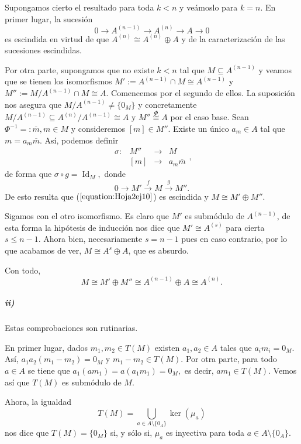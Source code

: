 \documentclass[../main.tex]{subfiles}
\begin{document}
Supongamos cierto el resultado para toda $k<n$ y veámoslo para $k=n$. En primer lugar, la sucesión
$$0\longrightarrow A^{(n-1)}\longrightarrow A^{(n)}\longrightarrow A\longrightarrow 0$$
es escindida en virtud de que $A^{(n)}\cong A^{(n)}\oplus A$ y de la caracterización de las sucesiones escindidas.

Por otra parte, supongamos que no existe $k<n$ tal que $M\subseteq A^{(n-1)}$ y veamos que se tienen los isomorfismos $M':=A^{(n-1)}\cap M\cong A^{(n-1)}$ y $M'':=M/{A^{(n-1)}\cap M}\cong A$. 
Comencemos por el segundo de ellos. La suposición nos asegura que $M/{A^{(n-1)}}\neq \{0_M\}$ y concretamente $M/{A^{(n-1)}}\subseteq A^{(n)}/{A^{(n-1)}}\cong A$ y $M''\overset{\Phi}{\cong}A$ por el caso base. 
Sean $\Phi^{-1}=:\overline{m},m\in M$ y consideremos $[m]\in M''$. Existe un único $a_m\in A$ tal que $m=a_m\overline{m}$. Así, podemos definir
$$\begin{array}{rrcl}
    \sigma:&M''&\longrightarrow&M\\
    &[m]&\longrightarrow&a_m\overline{m}
\end{array},$$
de forma que $\sigma\circ g=\operatorname{Id}_M,$ donde
\begin{equation}\label{equation:Hoja2ej10}
    0\overset{}{\longrightarrow}M'\overset{f}{\longrightarrow}M\overset{g}{\longrightarrow}M''.
\end{equation}
De esto resulta que ($\ref{equation:Hoja2ej10}$) es escindida y $M\cong M'\oplus M''$.

Sigamos con el otro isomorfismo. Es claro que $M'$ es submódulo de $A^{(n-1)}$, de esta forma la hipótesis de inducción nos dice que $M'\cong A^{(s)}$ para cierta $s\le n-1$. Ahora bien, necesariamente $s=n-1$ pues en caso contrario, por lo que acabamos de ver, $M\cong A^{s}\oplus A$, que es absurdo.

Con todo,
$$M\cong M'\oplus M''\cong A^{(n-1)}\oplus A\cong A^{(n)}.$$

\subparagraph{ii)} Estas comprobaciones son rutinarias.

En primer lugar, dados $m_1,m_2\in T(M)$ existen $a_1,a_2\in A$ tales que $a_im_i=0_M$. Así, $a_1a_2(m_1-m_2)=0_M$ y $m_1-m_2\in T(M).$ Por otra parte, para todo $a\in A$ se tiene que $a_1(am_1)=a(a_1m_1)=0_M,$ es decir, $am_1\in T(M)$. Vemos así que $T(M)$ es submódulo de $M$.

Ahora, la igualdad
$$T(M)=\bigcup_{a\in A\setminus\{0_A\}}\ker(\mu_a)$$ nos dice que $T(M)=\{0_M\}$ si, y sólo si, $\mu_a$ es inyectiva para toda $a\in A\setminus\{0_A\}.$
\end{document}
